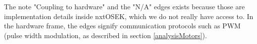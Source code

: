The note "Coupling to hardware" and the "N/A" edges exists because those are implementation details inside nxtOSEK, which we do not really have access to. In the hardware frame, the edges signify communication protocols such as PWM (pulse width modulation, as described in section \ref{analysisMotors}). 
